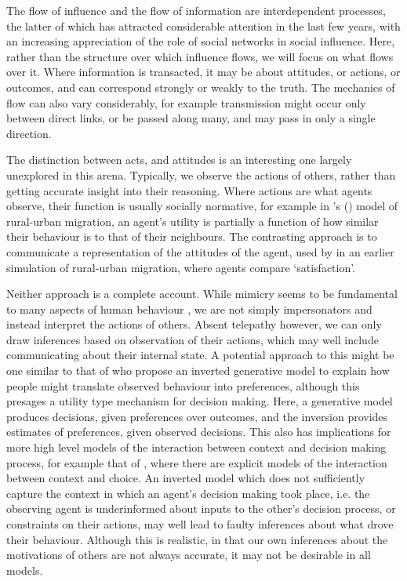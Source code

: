 \documentclass{article}
\begin{document}
The flow of influence and the flow of information are interdependent processes, the latter of which has attracted considerable attention in the last few years, with an increasing appreciation of the role of social networks in social influence. Here, rather than the structure over which influence flows, we will focus on what flows over it. 
Where information is transacted, it may be about attitudes, or actions, or outcomes, and can correspond strongly or weakly to the truth. The mechanics of flow can also vary considerably, for example transmission might occur only between direct links, or be passed along many, and may pass in only a single direction.

The distinction between acts, and attitudes is an interesting one largely unexplored in this arena. Typically, we observe the actions of others, rather than getting accurate insight into their reasoning. Where actions are what agents observe, their function is usually socially normative, for example in \citeauthor{Silveira2005}'s (\citeyear{Silveira2005}) model of rural-urban migration, an agent's utility is partially a function of how similar their behaviour is to that of their neighbours. The contrasting approach is to communicate a representation of the attitudes of the agent, used by \citet{Espindola2006} in an earlier simulation of rural-urban migration, where agents compare `satisfaction'.

Neither approach is a complete account. While mimicry seems to be fundamental to many aspects of human behaviour \citep{Chartrand1999}, we are not simply impersonators and instead interpret the actions of others. Absent telepathy however, we can only draw inferences based on observation of their actions, which may well include communicating about their internal state. A potential approach to this might be one similar to that of \citet{Jern2011a} who propose an inverted generative model to explain how people might translate observed behaviour into preferences, although this presages a utility type mechanism for decision making. Here, a generative model produces decisions, given preferences over outcomes, and the inversion provides estimates of preferences, given observed decisions. This also has implications for more high level models of the interaction between context and decision making process, for example that of \citet{Ben-Akiva2012}, where there are explicit models of the interaction between context and choice. An inverted model which does not sufficiently capture the context in which an agent's decision making took place, i.e. the observing agent is underinformed about inputs to the other's decision process, or constraints on their actions, may well lead to faulty inferences about what drove their behaviour. Although this is realistic, in that our own inferences about the motivations of others are not always accurate, it may not be desirable in all models.
\end{document}
